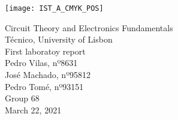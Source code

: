 \thispagestyle {empty}


\texttt{[image: IST\_A\_CMYK\_POS]}

\begin{center}

\vspace{1.0cm}

\vspace{1cm}
{\FontLb Circuit Theory and Electronics Fundamentals} \\ %
\vspace{0.5cm}
{\FontSn Técnico, University of Lisbon} \\ %
\vspace{0.5cm}
{\FontSn First laboratoy report} \\
\vspace{0.5cm}
{\FontSn Pedro Vilas, nº8631} \\
{\FontSn José Machado, nº95812} \\
{\FontSn Pedro Tomé, nº93151} \\
{\FontSn Group 68} \\


{\FontSn March 22, 2021} \\
\end{center}

